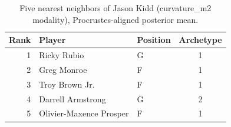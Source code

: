 \begin{table}[htbp]
  \centering\small
  \begin{tabular}{rllc}
    \toprule
    Rank & Player & Position & Archetype \\
    \midrule
    1 & Ricky Rubio & G & 1 \\
    2 & Greg Monroe & F & 1 \\
    3 & Troy Brown Jr. & F & 1 \\
    4 & Darrell Armstrong & G & 2 \\
    5 & Olivier-Maxence Prosper & F & 1 \\
    \bottomrule
  \end{tabular}
  \caption{Five nearest neighbors of Jason Kidd (curvature_m2 modality), Procrustes-aligned posterior mean.}
  \label{tab:Jason_Kidd_neighbors_curvature_m2}
\end{table}

